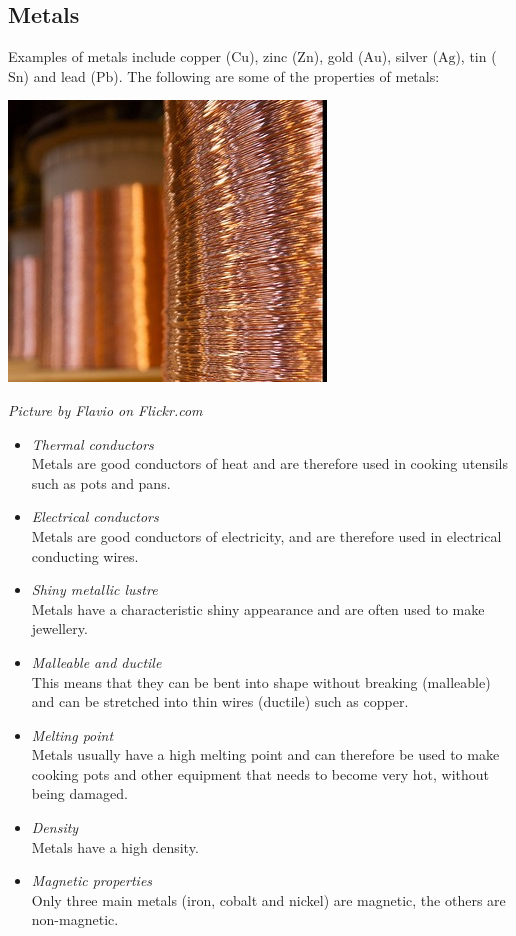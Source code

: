             \subsection*{Metals}
            \nopagebreak
\begin{minipage}{.5\textwidth}
        \label{m38708*id65726}Examples of metals include copper ($\mathrm{Cu}$), zinc ($\mathrm{Zn}$), gold ($\mathrm{Au}$), silver ($\mathrm{Ag}$), tin ($\mathrm{Sn}$) and lead ($\mathrm{Pb}$). The following are some of the properties of metals:\par 
\end{minipage}
\begin{minipage}{.5\textwidth}
\begin{center}
 \includegraphics[width=.2\textwidth]{photos/copperwireby-flavio.jpg}\par
\textit{Picture by Flavio on Flickr.com}
\end{center}
\end{minipage}
        \label{m38708*id65732}\begin{itemize}[noitemsep]
            \label{m38708*uid77}\item \textsl{Thermal conductors} \\
Metals are good conductors of heat and are therefore used in cooking utensils such as pots and pans.
\label{m38708*uid78}\item \textsl{Electrical conductors} \\
Metals are good conductors of electricity, and are therefore used in electrical conducting wires.
\label{m38708*uid79}\item \textsl{Shiny metallic lustre} \\
Metals have a characteristic shiny appearance and are often used to make jewellery.
\label{m38708*uid80}\item \textsl{Malleable and ductile} \\
This means that they can be bent into shape without breaking (malleable) and can be stretched into thin wires (ductile) such as copper.
\label{m38708*uid81}\item \textsl{Melting point} \\
Metals usually have a high melting point and can therefore be used to make cooking pots and other equipment that needs to become very hot, without being damaged.
\label{m38708*uid82}\item \textsl{Density} \\
Metals have a high density.
\item \textsl{Magnetic properties} \\ 
Only three main metals (iron, cobalt and nickel) are magnetic, the others are non-magnetic.
\end{itemize}
